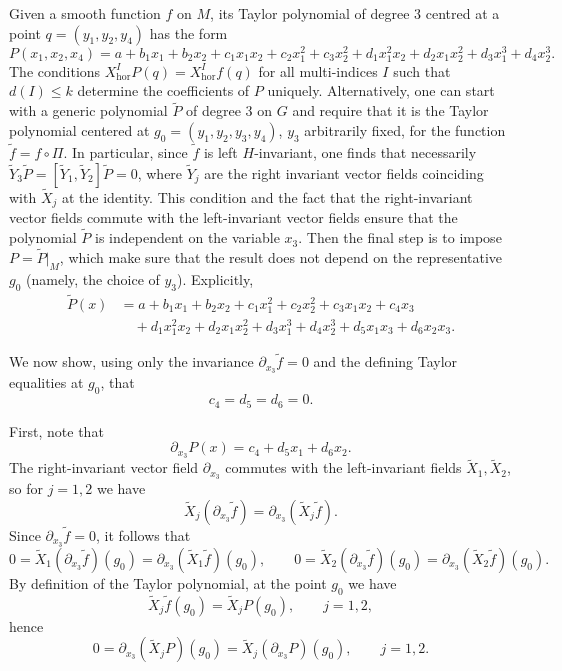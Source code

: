 \documentclass[12pt]{amsart}
\begin{document}
Given a smooth function $f$ on $M$, its Taylor polynomial of degree $3$ centred at a point $q=(y_1,y_2,y_4)$ has the form
$$
P(x_1,x_2,x_4) = a+b_1x_1 + b_2x_2+c_1x_1x_2+c_2x_1^2+c_3x_2^2 +d_1x_1^2x_2+ d_2x_1x_2^2+d_3x_1^3+d_4x_2^3.
$$
The conditions $X_{\mathrm{hor}}^IP(q)=X_{\mathrm{hor}}^If(q)$ for all multi-indices $I$ such that $d(I)\leq k$ determine the coefficients of $P$ uniquely. Alternatively, one can start with a generic polynomial $\tilde P$ of degree $3$ on $G$ and require that it is the Taylor polynomial centered at  $g_0 = (y_1,y_2,y_3,y_4)$, $y_3$  arbitrarily fixed, for the function $\tilde f = f\circ \Pi$. In particular, since $\tilde f$ is left $H$-invariant, one finds that necessarily $\tilde Y_3\tilde P = [\tilde Y_1,\tilde Y_2]\tilde P = 0$, where $\tilde Y_j$ are the right invariant vector fields coinciding with $\tilde X_j$ at the identity. This condition and the fact that the right-invariant vector fields commute with the left-invariant vector fields ensure that the polynomial $\tilde P$ is independent on the variable $x_3$.
Then the final step is to impose $P = \tilde P|_M$, which make sure that the result does not depend on the representative $g_0$ (namely, the choice of $y_3$). Explicitly, 
\begin{align*}
\tilde P(x)
&= a + b_1 x_1 + b_2 x_2
+ c_1 x_1^2 + c_2 x_2^2 + c_3 x_1 x_2 + c_4 x_3 \\
&\quad
+ d_1 x_1^2 x_2 + d_2 x_1 x_2^2 + d_3 x_1^3 + d_4 x_2^3
+ d_5 x_1 x_3 + d_6 x_2 x_3.
\end{align*}

We now show, using only the invariance $\partial_{x_3} \tilde f=0$ and the defining Taylor equalities at $g_0$,
that
\[
c_4 = d_5 = d_6 = 0.
\]


First, note that
\[
\partial_{x_3} P(x) = c_4 + d_5 x_1 + d_6 x_2.
\]
The right-invariant vector field $\partial_{x_3}$ commutes with the left-invariant fields
$\tilde X_1,\tilde X_2$, so for $j=1,2$ we have
\[
\tilde X_j(\partial_{x_3} \tilde f) = \partial_{x_3}(\tilde X_j \tilde f).
\]
Since $\partial_{x_3} \tilde f = 0$, it follows that
\[
0 = \tilde X_1(\partial_{x_3} \tilde f)(g_0) = \partial_{x_3}(\tilde X_1 \tilde f)(g_0),
\qquad
0 = \tilde X_2(\partial_{x_3} \tilde f)(g_0) = \partial_{x_3}(\tilde X_2 \tilde f)(g_0).
\]
By definition of the Taylor polynomial, at the point $g_0$ we have
\[
\tilde X_j\tilde f(g_0) = \tilde X_j P(g_0),\qquad j=1,2,
\]
hence
\[
0 = \partial_{x_3}(\tilde X_j P)(g_0) = \tilde X_j(\partial_{x_3} P)(g_0),
\qquad j=1,2.
\]
\end{document}
